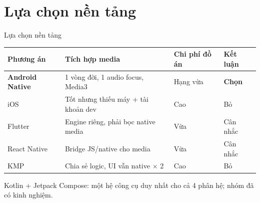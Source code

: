 \documentclass[aspectratio=169]{beamer}
\begin{document}
\section{Lựa chọn nền tảng}
\begin{frame}{Lựa chọn nền tảng}
  \small
  \begin{tabular}{@{}p{2.6cm}p{3.2cm}p{4.2cm}p{2.4cm}@{}}
    \toprule
    \textbf{Phương án} & \textbf{Tích hợp media} & \textbf{Chi phí đồ án} & \textbf{Kết luận} \\
    \midrule
    \textbf{Android Native} & 1 vòng đời, 1 audio focus, Media3 & Hạng vừa & \textbf{Chọn} \\
    iOS & Tốt nhưng thiếu máy + tài khoản dev & Cao & Bỏ \\
    Flutter & Engine riêng, phải bọc native media & Vừa & Cân nhắc \\
    React Native & Bridge JS/native cho media & Vừa & Cân nhắc \\
    KMP & Chia sẻ logic, UI vẫn native $\times$ 2 & Cao & Bỏ \\
    \bottomrule
  \end{tabular}
  \vfill
  {\small Kotlin + Jetpack Compose: một hệ công cụ duy nhất cho cả 4 phân hệ; nhóm đã có kinh nghiệm.}
\end{frame}

\end{document}
